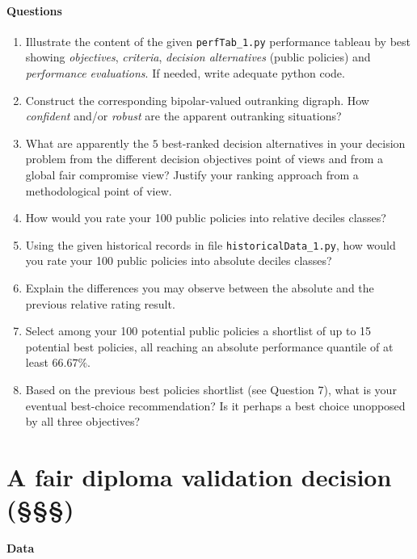 \paragraph{\textbf{Questions}}

\begin{enumerate}
\item Illustrate the content of the given \texttt{perfTab\_1.py} performance tableau by best showing \emph{objectives}, \emph{criteria}, \emph{decision alternatives} (public policies) and \emph{performance evaluations}. If needed, write adequate python code.
\item Construct the corresponding bipolar-valued outranking digraph. How \emph{confident} and/or \emph{robust} are the apparent outranking situations?
\item What are apparently the $5$ best-ranked decision alternatives in your decision problem from the different decision objectives point of views and from a global fair compromise view? Justify your ranking approach from a methodological point of view.
\item How would you rate your 100 public policies into relative deciles classes?
\item Using the given historical records in file \texttt{historicalData\_1.py}, how would you rate your 100 public policies into absolute deciles classes? 
\item Explain the differences you may observe between the absolute and the previous relative rating result.
\item  Select among your 100 potential public policies a shortlist of up to 15 potential best policies, all reaching an absolute performance quantile of at least $66.67\%$.
\item Based on the previous best policies shortlist (see Question 7), what is your eventual best-choice recommendation? Is it perhaps a best choice unopposed by all three objectives?
\end{enumerate}

\section{A fair diploma validation decision (§§§)}
\label{sec:15.6}

\paragraph{\textbf{Data}}

